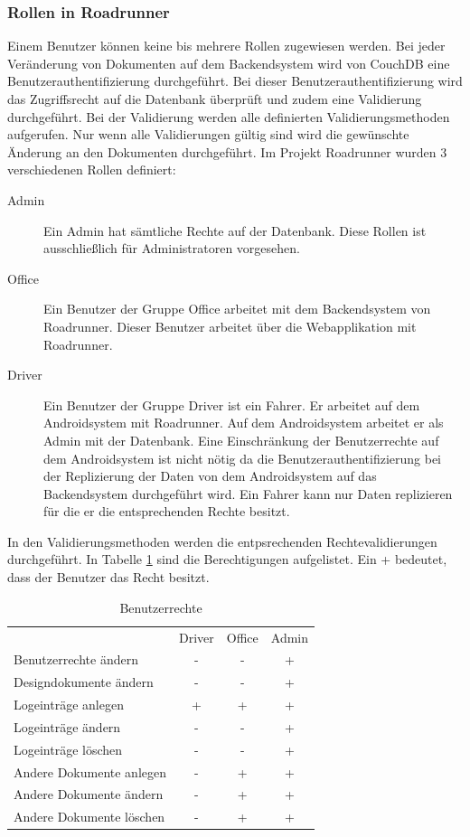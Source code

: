 \subsubsection{Rollen in Roadrunner}

Einem Benutzer können keine bis mehrere Rollen zugewiesen werden. Bei jeder Veränderung von Dokumenten auf dem Backendsystem wird von CouchDB eine Benutzerauthentifizierung durchgeführt. Bei dieser Benutzerauthentifizierung wird das Zugriffsrecht auf die Datenbank überprüft und zudem eine Validierung durchgeführt. Bei der Validierung werden alle definierten Validierungsmethoden aufgerufen. Nur wenn alle Validierungen gültig sind wird die gewünschte Änderung an den Dokumenten durchgeführt.
\newline \newline \noindent
Im Projekt Roadrunner wurden 3 verschiedenen Rollen definiert:
\begin{description}
\item[Admin] Ein Admin hat sämtliche Rechte auf der Datenbank. Diese Rollen ist ausschließlich für Administratoren vorgesehen.
\item[Office] Ein Benutzer der Gruppe Office arbeitet mit dem Backendsystem von Roadrunner. Dieser Benutzer arbeitet über die Webapplikation mit Roadrunner.
\item[Driver] Ein Benutzer der Gruppe Driver ist ein Fahrer. Er arbeitet auf dem Androidsystem mit Roadrunner. Auf dem Androidsystem arbeitet er als Admin mit der Datenbank. Eine Einschränkung der Benutzerrechte auf dem Androidsystem ist nicht nötig da die Benutzerauthentifizierung bei der Replizierung der Daten von dem Androidsystem auf das Backendsystem durchgeführt wird. Ein Fahrer kann nur Daten replizieren für die er die entsprechenden Rechte besitzt.
\end{description}

\noindent In den Validierungsmethoden werden die entpsrechenden Rechtevalidierungen durchgeführt. In Tabelle \ref{tab:rechte} sind die Berechtigungen aufgelistet. Ein + bedeutet, dass der Benutzer das Recht besitzt.

\begin{table}
\begin{tabular}{lccc}
	& Driver & Office & Admin \\
	Benutzerrechte ändern & - & - & + \\
	Designdokumente ändern & - & - & + \\
	Logeinträge anlegen & + & + & + \\
	Logeinträge ändern & - & - & + \\
	Logeinträge löschen & - & - & + \\
	Andere Dokumente anlegen & - & + & + \\
	Andere Dokumente ändern & - & + & + \\
	Andere Dokumente löschen & - & + & +
\end{tabular}
\caption{Benutzerrechte}
\label{tab:rechte}
\end{table}
